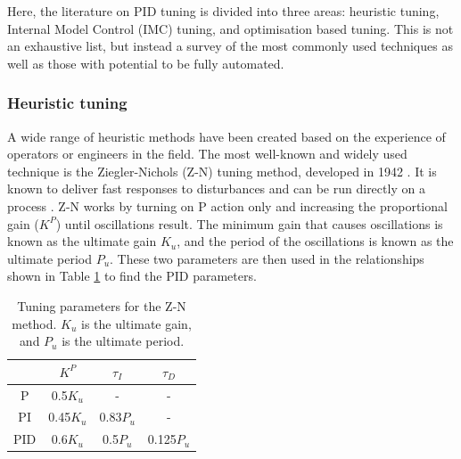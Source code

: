 Here, the literature on PID tuning is divided into three areas: heuristic tuning, Internal Model Control (IMC) tuning, and optimisation based tuning. This is not an exhaustive list, but instead a survey of the most commonly used techniques as well as those with potential to be fully automated.  

\subsubsection{Heuristic tuning}
A wide range of heuristic methods have been created based on the experience of operators or engineers in the field. The most well-known and widely used technique is the Ziegler-Nichols (Z-N) tuning method, developed in 1942 \cite{Ziegler1942}. It is known to deliver fast responses to disturbances and can be run directly on a process \cite{Riggs2006}. Z-N works by turning on P action only and increasing the proportional gain ($K^P$) until oscillations result. The minimum gain that causes oscillations is known as the ultimate gain $K_u$, and the period of the oscillations is known as the ultimate period $P_u$. These two parameters are then used in the relationships shown in Table \ref{table:ZN_parameters} to find the PID parameters.

\begin{table}[b]
	\centering
	\caption{Tuning parameters for the Z-N method. $K_u$ is the ultimate gain, and $P_u$ is the ultimate period.}
	\label{table:ZN_parameters}
	\begin{tabular}{ c c c c }
	& $K^P$ & $\tau_I$ & $\tau_D$ \\
	\hline
	P & 0.5$K_u$ & - & - \\
	PI & 0.45$K_u$ & 0.83$P_u$ & - \\
	PID & 0.6$K_u$ & 0.5$P_u$ & 0.125$P_u$ \\
	\end{tabular}
\end{table}

